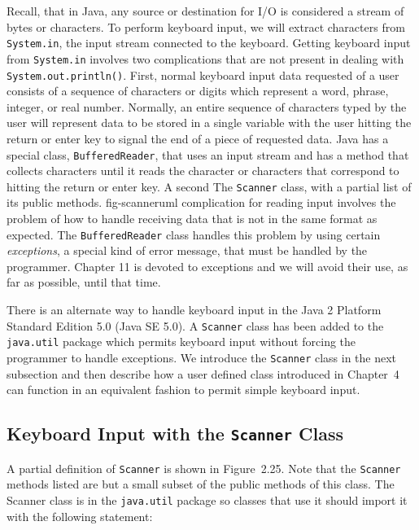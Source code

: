 Recall, that in Java, any source or destination for I/O is considered a 
stream of bytes or characters.  To perform keyboard input, we will extract
characters from {\tt System.in}, the input stream connected to the keyboard. 
Getting keyboard input from  {\tt System.in} involves two complications
that are not present in dealing with {\tt System.out.println()}.
First, normal keyboard input data requested of a user consists of a sequence
of characters or digits which represent a word, phrase, integer, or real 
number.  Normally, an entire sequence of characters typed by the user 
will represent data to be stored in a single variable with the user hitting 
the return or enter key to signal the end of a piece of requested data. Java has a
special class, {\tt BufferedReader}, that uses an input stream 
and has a method that collects characters until it reads the character or
characters that correspond to hitting the return or enter key. A second 
{The {\tt Scanner} class, with a
partial list of its public methods.}
{fig-scanneruml}
complication for reading input involves the problem of how to handle 
receiving data that is not in the same format as expected.  The 
{\tt BufferedReader} class handles this problem by using certain {\it exceptions},
a special kind of error message, that must be handled by the programmer.
Chapter 11 is devoted to exceptions and we will avoid their use, as far as
possible, until that time.

There is an alternate way to handle keyboard input in the Java 2
Platform Standard Edition 5.0 (Java SE 5.0). A {\tt Scanner} class has
been added to the {\tt java.util} package which permits keyboard input
without forcing the programmer to handle exceptions.  We introduce the
{\tt Scanner} class in the next subsection and then describe how a
user defined class introduced in Chapter~4 can function in an
equivalent fashion to permit simple keyboard input.

\subsection{Keyboard Input with the {\tt Scanner} Class} 

A partial definition of {\tt Scanner} is shown in Figure~2.25. Note
that the {\tt Scanner} methods listed are but a small subset of the 
public methods of this class.  The Scanner class is in the {\tt java.util}
package so classes that use it should import it with the following statement:

